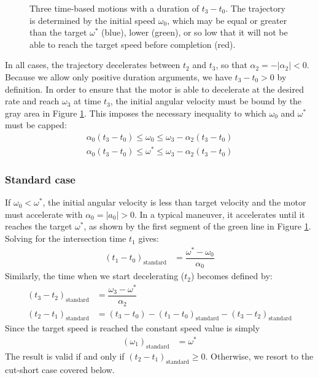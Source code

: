 \documentclass[12pt, a4paper]
{article}
\providecommand{\lr}[1]{\left(#1\right)}
\providecommand{\sub}[1]{_{\text{#1}}}
\providecommand{\w}{\omega}
\providecommand{\wt}{\w^*}
\renewcommand{\a}{\alpha}
\providecommand{\abs}[1]{\left|#1\right|}
\begin{document}
\begin{figure}[H]
    \centering
    
    \caption{
        Three time-based motions with a duration of $t_3-t_0$.
        The trajectory is determined by the initial speed $\w_0$,
        which may be equal or greater than the
        target $\wt$ (blue), lower (green), or so low that it will not be able
        to reach the target speed before completion (red).\label{fig:time}}
\end{figure}

In all cases, the trajectory decelerates between $t_2$ and $t_3$, so that
$\a_2  = - \abs{\a_2} < 0$. Because we allow only positive duration arguments,
we have $t_3-t_0 > 0$ by definition. In order to ensure that the motor is able
to decelerate at the desired rate and reach $\w_3$ at time $t_3$, the initial
angular velocity must be bound by the gray area in Figure \ref{fig:time}. This
imposes the necessary inequality to which $\w_0$ and $\wt$ must be capped:
%
\begin{align}
    \label{eq:t:timeboundary1}
    \a_0 \lr{t_3-t_0} \leq \w_0 \leq \w_3 - \a_2\lr{t_3-t_0}\\[1em]
    \a_0 \lr{t_3-t_0} \leq \wt \leq \w_3 - \a_2\lr{t_3-t_0}
\end{align}
%

\subsubsection{Standard case}
\label{sec:t:standard}
If $\w_0 < \wt$, the initial angular velocity is less than target velocity and
the motor must accelerate with $\a_0 = \abs{a_0} > 0$. In a typical maneuver,
it accelerates until it reaches the target $\wt$, as shown by the first
segment of the green line in Figure \ref{fig:time}. Solving for the
intersection time $t_1$ gives:
%
\begin{align}
    \label{eq:t:t1mt0:standard}
    \lr{t_1 - t_0}\sub{standard} &= \dfrac{\wt-\w_0}{\a_0}
\end{align}
%
Similarly, the time when we start decelerating ($t_2$) becomes defined by:
%
\begin{align}
    \label{eq:t:t3mt2:standard}
    \lr{t_3 - t_2}\sub{standard} &= \dfrac{\w_3-\wt}{\a_2}\\[1em]
    \label{eq:t:t2mt1:standard}
    \lr{t_2 - t_1}\sub{standard} &=
        (t_3-t_0) - \lr{t_1 - t_0}\sub{standard} - \lr{t_3 - t_2}\sub{standard}
\end{align}
%
Since the target speed is reached the constant speed value is simply
\begin{align}
    \lr{\w_1}\sub{standard} &= \wt
\end{align}
%
The result is valid if and only if $\lr{t_2 - t_1}\sub{standard}\geq 0$.
Otherwise, we resort to the cut-short case covered below.
\end{document}

